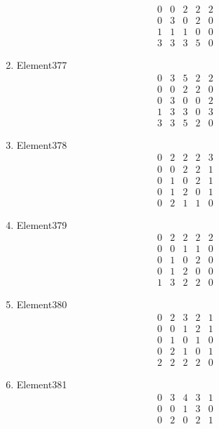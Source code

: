 \documentclass[12pt]{article}
\begin{document}
\begin{multicols}{3}
\begin{enumerate}
\begin{equation*}
\begin{array}{ccccc}
0&0&2&2&2\\
0&3&0&2&0\\
1&1&1&0&0\\
3&3&3&5&0
\end{array}
\end{equation*}
\item Element377
\begin{equation*}
\begin{array}{ccccc}
0&3&5&2&2\\
0&0&2&2&0\\
0&3&0&0&2\\
1&3&3&0&3\\
3&3&5&2&0
\end{array}
\end{equation*}
\item Element378
\begin{equation*}
\begin{array}{ccccc}
0&2&2&2&3\\
0&0&2&2&1\\
0&1&0&2&1\\
0&1&2&0&1\\
0&2&1&1&0
\end{array}
\end{equation*}
\item Element379
\begin{equation*}
\begin{array}{ccccc}
0&2&2&2&2\\
0&0&1&1&0\\
0&1&0&2&0\\
0&1&2&0&0\\
1&3&2&2&0
\end{array}
\end{equation*}
\item Element380
\begin{equation*}
\begin{array}{ccccc}
0&2&3&2&1\\
0&0&1&2&1\\
0&1&0&1&0\\
0&2&1&0&1\\
2&2&2&2&0
\end{array}
\end{equation*}
\item Element381
\begin{equation*}
\begin{array}{ccccc}
0&3&4&3&1\\
0&0&1&3&0\\
0&2&0&2&1\\

\end{array}
\end{equation*}
\end{enumerate}
\end{multicols}
\end{document}
